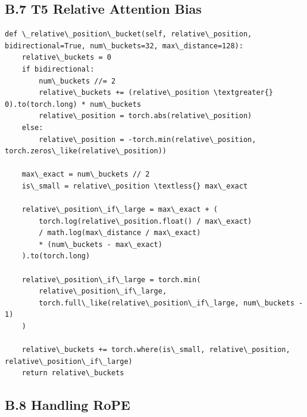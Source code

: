 \subsection{B.7 T5 Relative Attention Bias}

\begin{lstlisting}
def \_relative\_position\_bucket(self, relative\_position, bidirectional=True, num\_buckets=32, max\_distance=128):
    relative\_buckets = 0
    if bidirectional:
        num\_buckets //= 2
        relative\_buckets += (relative\_position \textgreater{} 0).to(torch.long) * num\_buckets
        relative\_position = torch.abs(relative\_position)
    else:
        relative\_position = -torch.min(relative\_position, torch.zeros\_like(relative\_position))
    
    max\_exact = num\_buckets // 2
    is\_small = relative\_position \textless{} max\_exact
    
    relative\_position\_if\_large = max\_exact + (
        torch.log(relative\_position.float() / max\_exact)
        / math.log(max\_distance / max\_exact)
        * (num\_buckets - max\_exact)
    ).to(torch.long)
    
    relative\_position\_if\_large = torch.min(
        relative\_position\_if\_large,
        torch.full\_like(relative\_position\_if\_large, num\_buckets - 1)
    )
    
    relative\_buckets += torch.where(is\_small, relative\_position, relative\_position\_if\_large)
    return relative\_buckets
\end{lstlisting}

\subsection{B.8 Handling RoPE}

